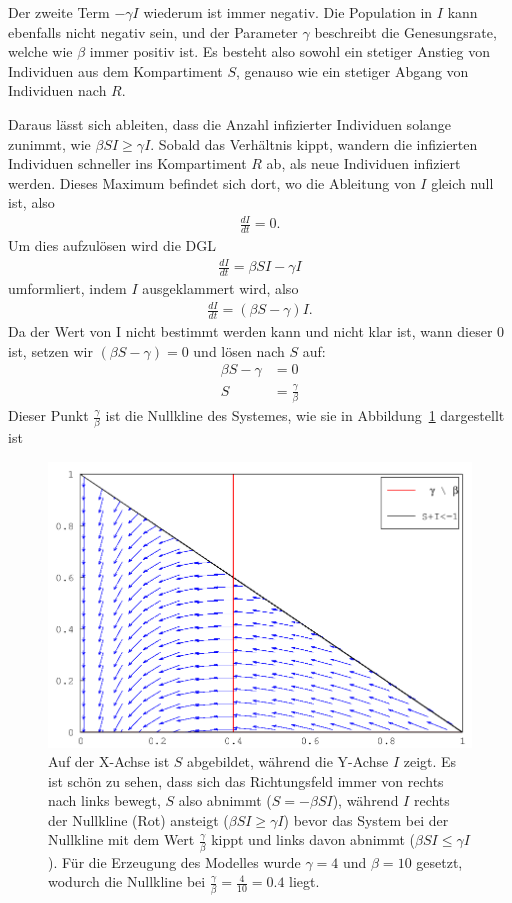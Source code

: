 \begin{refsection}
Der zweite Term $- \gamma I$ wiederum ist immer negativ. 
Die Population in $I$ kann ebenfalls nicht negativ sein, und der Parameter $\gamma$ beschreibt die Genesungsrate, welche wie $\beta$ immer positiv ist.
Es besteht also sowohl ein stetiger Anstieg von Individuen aus dem Kompartiment $S$, genauso wie ein stetiger Abgang von Individuen nach $R$.

Daraus lässt sich ableiten, dass die Anzahl infizierter Individuen solange zunimmt, wie $\beta S I \ge \gamma I$. Sobald das Verhältnis kippt, wandern die infizierten Individuen schneller ins Kompartiment $R$ ab, als neue Individuen infiziert werden.
Dieses Maximum befindet sich dort, wo die Ableitung von $I$ gleich null ist, also
\begin{align*}
  \frac{dI}{dt} = 0.
\end{align*}
Um dies aufzulösen wird die DGL 
\begin{align*}
  \frac{dI}{dt} = \beta S I - \gamma I
\end{align*}
umformliert, indem $I$ ausgeklammert wird, also
\begin{align*}
  \frac{dI}{dt} = \left(\beta S - \gamma \right) I.
\end{align*}
Da der Wert von I nicht bestimmt werden kann und nicht klar ist, wann dieser 0 ist, setzen wir $\left(\beta S - \gamma \right) = 0$ und lösen nach $S$ auf:
\begin{align*}
  \beta S - \gamma &= 0 \\
  S &= \frac{\gamma}{\beta}
\end{align*}
Dieser Punkt $\frac{\gamma}{\beta}$ ist die Nullkline des Systemes, wie sie in Abbildung~\ref{fig:quiver} dargestellt ist

\begin{figure}[h]
  \centering
  \includegraphics[width=.8\textwidth]{sir/images/quiver}
  \caption[Nullkline]{Auf der X-Achse ist $S$ abgebildet, während die Y-Achse $I$ zeigt. Es ist schön zu sehen, dass sich das Richtungsfeld immer von rechts nach links bewegt, $S$ also abnimmt ($S = - \beta S I$), während $I$ rechts der Nullkline (Rot) ansteigt ($\beta S I \ge \gamma I$) bevor das System bei der Nullkline mit dem Wert $\frac{\gamma}{\beta}$ kippt und links davon abnimmt ($\beta S I \le \gamma I$). Für die Erzeugung des Modelles wurde $\gamma = 4$ und $\beta = 10$ gesetzt, wodurch die Nullkline bei $\frac{\gamma}{\beta} = \frac{4}{10} = 0.4$ liegt.} 
  \label{fig:quiver}
\end{figure}


\end{refsection}

